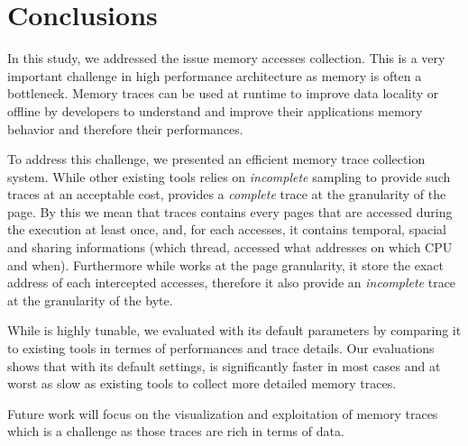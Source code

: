 \section{Conclusions}
\label{sec:cncl}

In this study, we addressed the issue memory accesses collection. This is a
very important challenge in high performance architecture as memory is often a
bottleneck. Memory traces can be used at runtime to improve data locality or
offline by developers to understand and improve their applications memory
behavior and therefore their performances.

To address this challenge, we  presented \Moca an efficient memory trace
collection system. While other existing tools relies on \emph{incomplete} sampling to
provide such traces at an acceptable cost, \Moca provides a \emph{complete}
trace at the granularity of the page. By this we mean that \Moca traces
contains every pages that are accessed during the execution at least once,
and, for each accesses, it contains temporal, spacial and sharing
informations (which thread, accessed what addresses on which CPU and when).
Furthermore while \Moca works at the page granularity, it store the exact
address of each intercepted accesses, therefore it also provide an
\emph{incomplete} trace at the granularity of the byte.

While \Moca is highly tunable, we evaluated with its default parameters by
comparing it to existing tools in termes of performances and trace details.
Our evaluations shows that with its default settings, \Moca is significantly
faster in most cases and at worst as slow as existing tools to collect more
detailed memory traces.

Future work will focus on the visualization and exploitation of memory traces
which is a challenge as those traces are rich in terms of data.
